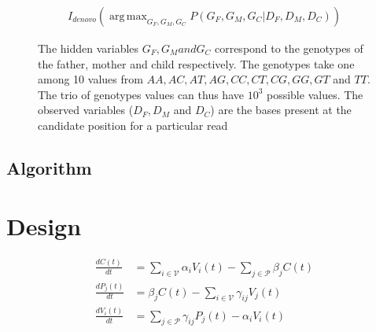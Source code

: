 \documentclass{article}
\DeclareMathOperator*{\argmax}{arg\,max}
\begin{document}
\begin{align}
I_{denovo}(\argmax_{G_F,G_M,G_C} P(G_F,G_M,G_C|D_F,D_M,D_C))
\end{align}


\begin{figure}
\centering
{}
\caption{The hidden variables $G_{F}, G_{M} and G_{C}$ correspond to the genotypes of the father, mother and child respectively. The genotypes take one among 10 values from $AA, AC, AT, AG, CC, CT, CG, GG, GT$ and $TT$. The trio of genotypes values can thus have $10^3$ possible values. The observed variables ($D_F, D_M$ and $D_C$) are the bases present at the candidate position for a particular read }
\label{fig:bayesnet}
\end{figure}

\subsection{Algorithm}

\section{Design}




\begin{align}\label{eqn:diffeq}
\frac{dC(t)}{dt}  &= \sum_{i \in \mathcal{V}}\alpha_i V_i(t) - \sum_{j \in \mathcal{P}}\beta_j C(t)\\
\frac{dP_j(t)}{dt}  &= \beta_j C(t) - \sum_{i \in \mathcal{V}}\gamma_{ij}V_j(t) \\
\frac{dV_i(t)}{dt}  &= \sum_{j \in \mathcal{P}}\gamma_{ij}P_j(t) - \alpha_i V_i(t)
\end{align}
\end{document}
